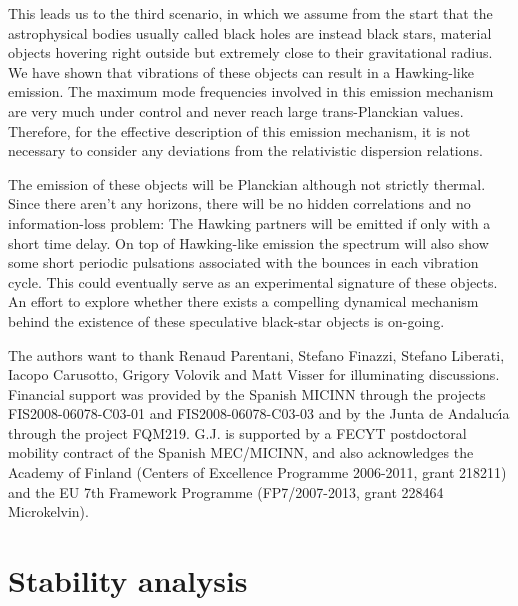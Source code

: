 \documentclass[11pt,a4paper]{article}
\begin{document}
This leads us to the third scenario, in which we assume from the start that the astrophysical bodies 
usually called black holes are instead black stars, material objects hovering right 
outside but extremely close to their gravitational radius. We have shown that vibrations
of these objects can result in a Hawking-like emission. The maximum mode frequencies 
involved in this emission mechanism are very much under control and never reach large 
trans-Planckian values. Therefore, for the effective description of this
emission mechanism, it is not necessary to consider any deviations from the relativistic
dispersion relations. 

The emission of these objects will be Planckian although not strictly thermal. Since there aren't any horizons, there will be no hidden correlations and no information-loss problem: The 
Hawking partners will be emitted if only with a short time delay. On top of Hawking-like 
emission the spectrum will also show some short periodic pulsations associated with the 
bounces in each vibration cycle. This could eventually serve as an experimental signature of these
objects. An effort to explore whether there exists a compelling dynamical mechanism 
behind the existence  of these speculative black-star objects is on-going.



\acknowledgments

The authors want to thank Renaud Parentani, Stefano Finazzi, Stefano Liberati, Iacopo Carusotto, Grigory Volovik and Matt Visser for illuminating discussions. Financial support was provided by the Spanish MICINN through the
projects FIS2008-06078-C03-01 and FIS2008-06078-C03-03 and by
the Junta de Andaluc\'{\i}a through the project FQM219. 
G.J. is supported by a FECYT postdoctoral mobility contract of the Spanish MEC/MICINN, and also 
acknowledges the Academy of Finland (Centers of Excellence
Programme  2006-2011, grant 218211) and the EU 7th Framework Programme
(FP7/2007-2013,  grant 228464 Microkelvin). 


\appendix

\section{Stability analysis}
\end{document}
